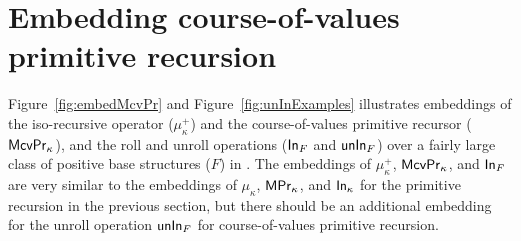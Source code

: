 \section{Embedding course-of-values primitive recursion}
\label{sec:fixi:cv}



Figure~\ref{fig:embedMcvPr} and Figure~\ref{fig:unInExamples}
illustrates embeddings of the iso-recursive operator ($\mu^{+}_\kappa$) and
the course-of-values primitive recursor ($\mathsf{McvPr}_\kappa$), and
the roll and unroll operations ($\mathsf{In}_F$ and $\mathsf{unIn}_F$) over
a fairly large class of positive base structures ($F$) in \Fixi.
The embeddings of $\mu^{+}_\kappa$, $\mathsf{McvPr}_\kappa$, and $\mathsf{In}_F$
are very similar to the embeddings of $\mu_\kappa$, $\mathsf{MPr}_\kappa$,
and $\mathsf{In}_\kappa$ for the primitive recursion in the previous section,
but there should be an additional embedding for the unroll operation $\mathsf{unIn}_F$
for course-of-values primitive recursion.

